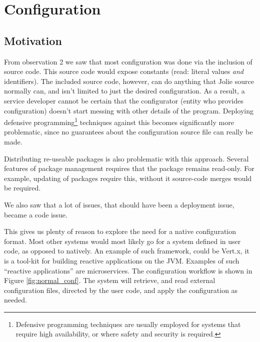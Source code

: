 \section{Configuration}


\subsection{Motivation}

From observation 2 we saw that most configuration was done via the inclusion of
source code. This source code would expose constants (read: literal values
\emph{and} identifiers). The included source code, however, can do anything
that Jolie source normally can, and isn't limited to just the desired
configuration. As a result, a service developer cannot be certain that the
configurator (entity who provides configuration) doesn't start messing with
other details of the program. Deploying defensive
programming\footnote{Defensive programming techniques are usually employed for
systems that require high availability, or where safety and security is
required.} techniques against this becomes significantly more problematic,
since no guarantees about the configuration source file can really be made.

Distributing re-useable packages is also problematic with this approach.
Several features of package management requires that the package remains
read-only. For example, updating of packages require this, without it
source-code merges would be required.

We also saw that a lot of issues, that should have been a deployment issue,
became a code issue.

This gives us plenty of reason to explore the need for a native configuration
format.  Most other systems would most likely go for a system defined in user
code, as opposed to natively. An example of such framework, could be Vert.x, it
is a tool-kit for building reactive applications on the JVM.  Examples of such
``reactive applications'' are microservices. The configuration workflow is
shown in Figure \ref{fig:normal_conf}. The system will retrieve, and read
external configuration files, directed by the user code, and apply the
configuration as needed.


